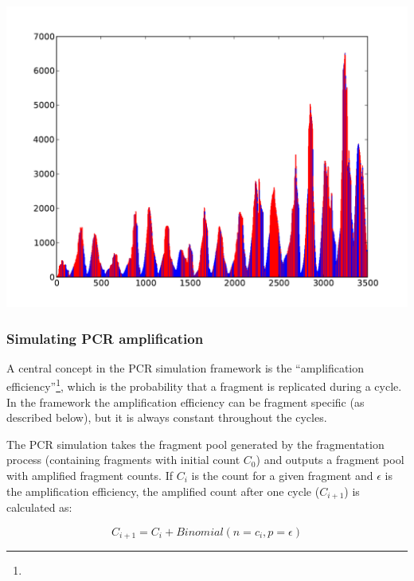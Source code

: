 \begin{center}
\includegraphics[scale=0.6,page=1]{../src/test/cov/cov_prim_jump.pdf}
\end{center}


\subsubsection{Simulating PCR amplification}

A central concept in the \rlsim PCR simulation framework is the ``amplification efficiency''\footnote{}, which is the probability that 
a fragment is replicated during a cycle. In the \rlsim framework the amplification efficiency can be fragment specific (as described below), but it is always constant throughout the cycles.

The PCR simulation takes the fragment pool generated by the fragmentation process (containing fragments with initial count $C_0$) and outputs a fragment pool
with amplified fragment counts.
If $C_i$ is the count for a given fragment and $\epsilon$ is the amplification efficiency, the amplified count after one cycle ($C_{i+1}$) is calculated as:

\begin{equation}
    C_{i+1} = C_i + Binomial(n=c_i, p=\epsilon)
\end{equation}

